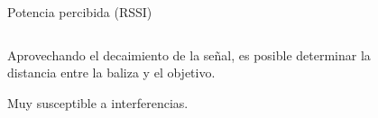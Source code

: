 \documentclass{beamer}
\begin{document}
    \begin{frame}{Potencia percibida (RSSI)}
      \begin{columns}
        \begin{column}{0.5\textwidth}
          Aprovechando el decaimiento de la señal, es posible determinar la distancia entre la baliza y el objetivo.

          \vspace{0.5cm}
          Muy susceptible a interferencias.
        \end{column}
        \begin{column}{0.5\textwidth}  
          \begin{figure}[H]
            \centering
            \def\svgwidth{\linewidth}
            
            \label{fig:TOA}
        \end{figure}
        \end{column}
        \end{columns}
    \end{frame}


\end{document}
